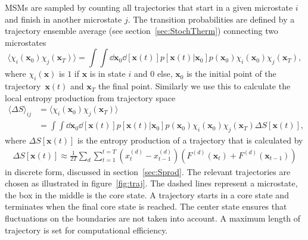 MSMs are sampled by counting all trajectories that start in a given microstate $i$ and finish in another microstate $j$. The transition probabilities are defined by a trajectory ensemble average (see section~\ref{sec:StochTherm}) connecting two microstates
\begin{equation}
 \langle \chi_i (\mathbf{x}_0) \chi_j(\mathbf{x}_T) \rangle = \int \int \dd{\mathbf{x}_0} \dd{[\mathbf{x}(t)]} p [\mathbf{x}(t) | \mathbf{x}_0] p(\mathbf{x}_0) \chi_i(\mathbf{x}_0) \chi_j(\mathbf{x}_T) ,
\end{equation}
where $\chi_i(\mathbf{x})$ is $1$ if $\mathbf{x}$ is in state $i$ and $0$ else, $\mathbf{x}_0$ is the initial point of the trajectory~$\mathbf{x}(t)$ and $\mathbf{x}_T$ the final point. Similarly we  use this to calculate the local entropy production from trajectory space
\begin{equation}
\begin{aligned}
  \langle \Delta S \rangle_{ij} &=  \langle \chi_i (\mathbf{x}_0) \chi_j(\mathbf{x}_T) \rangle \\ &= \int \int \dd{\mathbf{x}_0} \dd{[\mathbf{x}(t)]} p [\mathbf{x}(t) | \mathbf{x}_0] p(\mathbf{x}_0) \chi_i(\mathbf{x}_0) \chi_j(\mathbf{x}_T) \Delta S[\mathbf{x}(t)] ,
\end{aligned}
\end{equation}
where $\Delta S[\mathbf{x}(t)]$ is the entropy production of a trajectory that is calculated by 
\begin{equation}
\begin{aligned}
  \Delta S [\mathbf{x}(t)] \approx \frac{1}{2T} \sum_d \sum_{t=1}^{t=T} \left ( x^{(d)}_t - x^{(d)}_{t-1} \right ) \left ( F^{(d)}({\mathbf{x}}_t) + F^{(d)}({\mathbf{x}}_{t-1}) \right )
\end{aligned}
\end{equation}
in discrete form, discussed in section~\ref{sec:Sprod}. The relevant trajectories are chosen  as illustrated in figure~\ref{fig:traj}. The dashed lines represent a microstate, the box in the middle is the core state. A trajectory starts in a core state and terminates when the final core state is reached. The center state ensures that fluctuations on the boundaries are not taken into account.  A maximum length of trajectory is set for computational efficiency.
